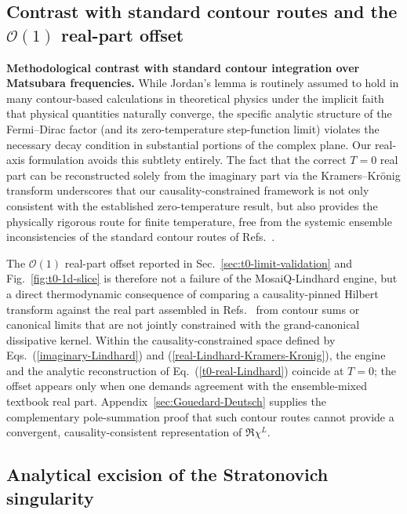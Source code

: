 \documentclass[aps,showkeys,noshowpacs,superscriptaddress,pre,preprint]{revtex4-2}
\let\label\orilabel
\begin{document}
\subsection{Contrast with standard contour routes and the $\mathcal{O}(1)$ real-part offset}
\label{sec:t0-kk-contrast}

\textbf{Methodological contrast with standard contour integration over Matsubara frequencies.}
While Jordan's lemma is routinely assumed to hold in many contour-based calculations in theoretical physics under the implicit faith that physical quantities naturally converge, the specific analytic structure of the Fermi--Dirac factor (and its zero-temperature step-function limit) violates the necessary decay condition in substantial portions of the complex plane. Our real-axis formulation avoids this subtlety entirely. The fact that the correct \(T=0\) real part can be reconstructed solely from the imaginary part via the Kramers--Kr\"onig transform underscores that our causality-constrained framework is not only consistent with the established zero-temperature result, but also provides the physically rigorous route for finite temperature, free from the systemic ensemble inconsistencies of the standard contour routes of Refs.~\cite{Giuliani-Vignale2005,Gouedard-Deutsch1978}.

The $\mathcal{O}(1)$ real-part offset reported in Sec.~\ref{sec:t0-limit-validation} and Fig.~\ref{fig:t0-1d-slice} is therefore not a failure of the MosaiQ-Lindhard engine, but a direct thermodynamic consequence of comparing a causality-pinned Hilbert transform against the real part assembled in Refs.~\cite{Giuliani-Vignale2005,Gouedard-Deutsch1978} from contour sums or canonical limits that are not jointly constrained with the grand-canonical dissipative kernel. Within the causality-constrained space defined by Eqs.~(\ref{imaginary-Lindhard}) and (\ref{real-Lindhard-Kramers-Kronig}), the engine and the analytic reconstruction of Eq.~(\ref{t0-real-Lindhard}) coincide at $T=0$; the offset appears only when one demands agreement with the ensemble-mixed textbook real part. Appendix~\ref{sec:Gouedard-Deutsch} supplies the complementary pole-summation proof that such contour routes cannot provide a convergent, causality-consistent representation of $\Re \chi^L$.

\subsection{Analytical excision of the Stratonovich singularity}
\label{sec:singularity-excision}
\end{document}
